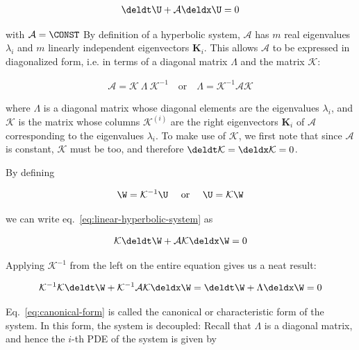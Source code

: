 \begin{align}
    \deldt \U + \mathcal{A} \deldx \U = 0 \label{eq:linear-hyperbolic-system}
\end{align}

with $\mathcal{A} = \CONST$
By definition of a hyperbolic system, $\mathcal{A}$ has $m$ real
eigenvalues $\lambda_i$ and $m$ linearly independent eigenvectors $\mathbf{K}_i$. This allows
$\mathcal{A}$ to be expressed in diagonalized form, i.e. in terms of a diagonal matrix $\Lambda$
and the matrix $\mathcal{K}$:

\begin{align}
 \mathcal{A} = \mathcal{K} \ \Lambda \ \mathcal{K}^{-1} \quad \text{or} \quad
 \Lambda = \mathcal{K}^{-1} \mathcal{A} \mathcal{K}
\end{align}

where $\Lambda$ is a diagonal matrix whose diagonal elements are the eigenvalues $\lambda_i$, and
$\mathcal{K}$ is the matrix whose columns $\mathcal{K}^{(i)}$ are the right eigenvectors
$\mathbf{K}_i$ of $\mathcal{A}$ corresponding to the eigenvalues $\lambda_i$. To make use of
$\mathcal{K}$, we first note that since $\mathcal{A}$ is constant, $\mathcal{K}$ must be too, and
therefore $\deldt \mathcal{K} = \deldx \mathcal{K} = 0$.

By defining

\begin{align}
 \W = \mathcal{K}^{-1} \U \quad \text{ or } \quad \U = \mathcal{K} \W
\end{align}

we can write eq.~\ref{eq:linear-hyperbolic-system} as

\begin{align}
  \mathcal{K} \deldt \W + \mathcal{A} \mathcal{K} \deldx \W = 0
\end{align}

Applying $\mathcal{K}^{-1}$ from the left on the entire equation gives us a neat result:


\begin{align}
  \mathcal{K}^{-1} \mathcal{K} \deldt \W + \mathcal{K}^{-1} \mathcal{A} \mathcal{K} \deldx \W  =
  \deldt \W + \Lambda \deldx \W = 0 \label{eq:canonical-form}
\end{align}

Eq.~\ref{eq:canonical-form} is called the canonical or characteristic form of the system. In this
form, the system is decoupled: Recall that $\Lambda$ is a diagonal matrix, and hence the $i$-th PDE
of the system is given by


